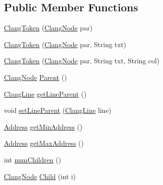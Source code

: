 \subsection*{Public Member Functions}
\begin{DoxyCompactItemize}
\item 
\mbox{\hyperlink{classghidra_1_1app_1_1decompiler_1_1_clang_token_a8fef517c1b71fcd24e3e8677e91c4397}{Clang\+Token}} (\mbox{\hyperlink{interfaceghidra_1_1app_1_1decompiler_1_1_clang_node}{Clang\+Node}} par)
\item 
\mbox{\hyperlink{classghidra_1_1app_1_1decompiler_1_1_clang_token_ad21f7bf2e47d465f0b37d2b6ae6ef146}{Clang\+Token}} (\mbox{\hyperlink{interfaceghidra_1_1app_1_1decompiler_1_1_clang_node}{Clang\+Node}} par, String txt)
\item 
\mbox{\hyperlink{classghidra_1_1app_1_1decompiler_1_1_clang_token_ad16c38cbfedefe4f3542219501135b8d}{Clang\+Token}} (\mbox{\hyperlink{interfaceghidra_1_1app_1_1decompiler_1_1_clang_node}{Clang\+Node}} par, String txt, String col)
\item 
\mbox{\hyperlink{interfaceghidra_1_1app_1_1decompiler_1_1_clang_node}{Clang\+Node}} \mbox{\hyperlink{classghidra_1_1app_1_1decompiler_1_1_clang_token_ae1b89249984d1228998b6fe8ed8c67b9}{Parent}} ()
\item 
\mbox{\hyperlink{classghidra_1_1app_1_1decompiler_1_1_clang_line}{Clang\+Line}} \mbox{\hyperlink{classghidra_1_1app_1_1decompiler_1_1_clang_token_aea8250f4e75b6fe1cd225ae52fa9a84b}{get\+Line\+Parent}} ()
\item 
void \mbox{\hyperlink{classghidra_1_1app_1_1decompiler_1_1_clang_token_abc305091ad910f273f840684392739c2}{set\+Line\+Parent}} (\mbox{\hyperlink{classghidra_1_1app_1_1decompiler_1_1_clang_line}{Clang\+Line}} line)
\item 
\mbox{\hyperlink{class_address}{Address}} \mbox{\hyperlink{classghidra_1_1app_1_1decompiler_1_1_clang_token_ad29a43e8aae3a2250fcb8632a4010993}{get\+Min\+Address}} ()
\item 
\mbox{\hyperlink{class_address}{Address}} \mbox{\hyperlink{classghidra_1_1app_1_1decompiler_1_1_clang_token_aba3444e5da7a465cb090f4a7f15d8889}{get\+Max\+Address}} ()
\item 
int \mbox{\hyperlink{classghidra_1_1app_1_1decompiler_1_1_clang_token_a32dba894529a2a7bb3aa7ba488b63af2}{num\+Children}} ()
\item 
\mbox{\hyperlink{interfaceghidra_1_1app_1_1decompiler_1_1_clang_node}{Clang\+Node}} \mbox{\hyperlink{classghidra_1_1app_1_1decompiler_1_1_clang_token_a1a334ac11609a6a1d53d0faca1157d2f}{Child}} (int i)

\end{DoxyCompactItemize}
